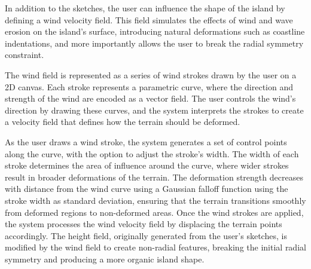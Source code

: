 In addition to the sketches, the user can influence the shape of the island by defining a wind velocity field. This field simulates the effects of wind and wave erosion on the island's surface, introducing natural deformations such as coastline indentations, and more importantly allows the user to break the radial symmetry constraint.

The wind field is represented as a series of wind strokes drawn by the user on a 2D canvas. Each stroke represents a parametric curve, where the direction and strength of the wind are encoded as a vector field. The user controls the wind's direction by drawing these curves, and the system interprets the strokes to create a velocity field that defines how the terrain should be deformed.

As the user draws a wind stroke, the system generates a set of control points along the curve, with the option to adjust the stroke's width. The width of each stroke determines the area of influence around the curve, where wider strokes result in broader deformations of the terrain.
The deformation strength decreases with distance from the wind curve using a Gaussian falloff function using the stroke width as standard deviation, ensuring that the terrain transitions smoothly from deformed regions to non-deformed areas.
Once the wind strokes are applied, the system processes the wind velocity field by displacing the terrain points accordingly. The height field, originally generated from the user's sketches, is modified by the wind field to create non-radial features, breaking the initial radial symmetry and producing a more organic island shape.










